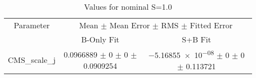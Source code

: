 \begin{table}
\centering
\caption{Values for nominal S=1.0}
\begin{tabular}{ccc}
\toprule
Parameter & \multicolumn{2}{c}{Mean $\pm$ Mean Error $\pm$ RMS $\pm$ Fitted Error}\\
 & B-Only Fit & S+B Fit\\
\midrule
CMS\_scale\_j & \num{0.0966889} $\pm$ \num{0} $\pm$ \num{0} $\pm$ \num{0.0909254} & \num{-5.16855e-08} $\pm$ \num{0} $\pm$ \num{0} $\pm$ \num{0.113721}\\
\bottomrule
\end{tabular}
\end{table}